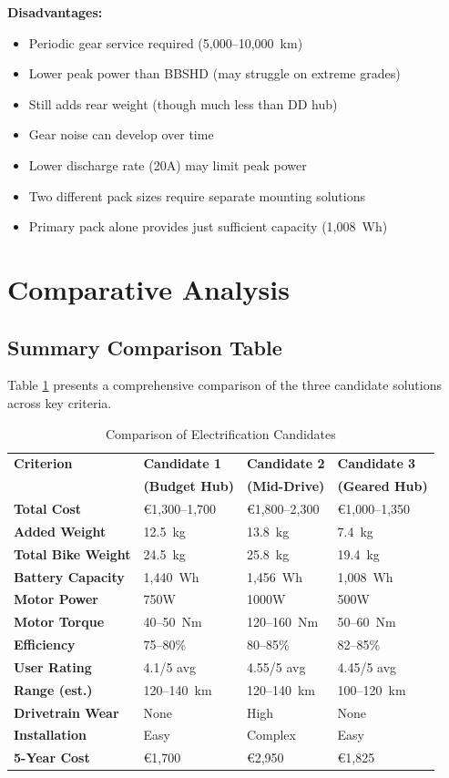 \documentclass[12pt,a4paper]{article}
\begin{document}
\textbf{Disadvantages:}
\begin{itemize}
    \item Periodic gear service required (5,000--10,000~km)
    \item Lower peak power than BBSHD (may struggle on extreme grades)
    \item Still adds rear weight (though much less than DD hub)
    \item Gear noise can develop over time
    \item Lower discharge rate (20A) may limit peak power
    \item Two different pack sizes require separate mounting solutions
    \item Primary pack alone provides just sufficient capacity (1,008~Wh)
\end{itemize}

\section{Comparative Analysis}

\subsection{Summary Comparison Table}

Table \ref{tab:comparison} presents a comprehensive comparison of the three candidate solutions across key criteria.

\begin{table}[htbp]
\centering
\caption{Comparison of Electrification Candidates}
\label{tab:comparison}
\small
\begin{tabular}{@{}llll@{}}
\toprule
\textbf{Criterion} & \textbf{Candidate 1} & \textbf{Candidate 2} & \textbf{Candidate 3} \\
                   & \textbf{(Budget Hub)} & \textbf{(Mid-Drive)} & \textbf{(Geared Hub)} \\ \midrule
\textbf{Total Cost} & €1,300--1,700 & €1,800--2,300 & €1,000--1,350 \\
\textbf{Added Weight} & 12.5~kg & 13.8~kg & 7.4~kg \\
\textbf{Total Bike Weight} & 24.5~kg & 25.8~kg & 19.4~kg \\
\textbf{Battery Capacity} & 1,440~Wh & 1,456~Wh & 1,008~Wh \\
\textbf{Motor Power} & 750W & 1000W & 500W \\
\textbf{Motor Torque} & 40--50~Nm & 120--160~Nm & 50--60~Nm \\
\textbf{Efficiency} & 75--80\% & 80--85\% & 82--85\% \\
\textbf{User Rating} & 4.1/5 avg & 4.55/5 avg & 4.45/5 avg \\
\textbf{Range (est.)} & 120--140~km & 120--140~km & 100--120~km \\
\textbf{Drivetrain Wear} & None & High & None \\
\textbf{Installation} & Easy & Complex & Easy \\
\textbf{5-Year Cost} & €1,700 & €2,950 & €1,825 \\ \bottomrule
\end{tabular}
\end{table}
\end{document}

